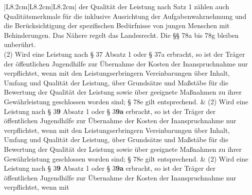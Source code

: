 \documentclass[10pt,a4paper,landscape]{article}
\begin{document}
\begin{longtable}{|L{8.2cm}|L{8.2cm}|L{8.2cm}|}
der  \newline Qualität der Leistung nach Satz 1 zählen  \newline auch Qualitätsmerkmale für die inklusive  \newline Ausrichtung der Aufgabenwahrnehmung  \newline und die Berücksichtigung der spezifischen  \newline Bedürfnisse von jungen Menschen mit  \newline Behinderungen. Das Nähere regelt das  \newline Landesrecht. Die \S{}\S{} 78a bis 78g bleiben  \newline unberührt. \\
\hhline{|---|}
(2) Wird eine Leistung nach \S{} \textcolor{diffred}{37} Absatz 1  \newline oder \S{} \textcolor{diffred}{37a} erbracht, so ist der Träger der  \newline öffentlichen Jugendhilfe zur Übernahme  \newline der Kosten der Inanspruchnahme nur  \newline verpflichtet, wenn mit den  \newline Leistungserbringern Vereinbarungen über  \newline Inhalt, Umfang und Qualität der Leistung,  \newline über Grundsätze und Maßstäbe für die  \newline Bewertung der Qualität der Leistung sowie  \newline über geeignete Maßnahmen zu ihrer  \newline Gewährleistung geschlossen worden sind;  \newline \S{} 78e gilt entsprechend. & (2) Wird eine Leistung nach \S{} 3\textbf{9} Absatz 1  \newline oder \S{} 3\textbf{9a} erbracht, so ist der Träger der  \newline öffentlichen Jugendhilfe zur Übernahme  \newline der Kosten der Inanspruchnahme nur  \newline verpflichtet, wenn mit den  \newline Leistungserbringern Vereinbarungen über  \newline Inhalt, Umfang und Qualität der Leistung,  \newline über Grundsätze und Maßstäbe für die  \newline Bewertung der Qualität der Leistung sowie  \newline über geeignete Maßnahmen zu ihrer  \newline Gewährleistung geschlossen worden sind;  \newline \S{} 78e gilt entsprechend. & (2) Wird eine Leistung nach \S{} 3\textbf{9} Absatz 1  \newline oder \S{} 3\textbf{9a} erbracht, so ist der Träger der  \newline öffentlichen Jugendhilfe zur Übernahme  \newline der Kosten der Inanspruchnahme nur  verpflichtet, wenn mit 
\end{longtable}
\end{document}

